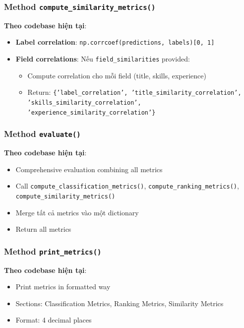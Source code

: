 \subsubsection{Method \texttt{compute\_similarity\_metrics()}}

\textbf{Theo codebase hiện tại}:

\begin{itemize}
    \item \textbf{Label correlation}: \texttt{np.corrcoef(predictions, labels)[0, 1]}
    \item \textbf{Field correlations}: Nếu \texttt{field\_similarities} provided:
    \begin{itemize}
        \item Compute correlation cho mỗi field (title, skills, experience)
        \item Return: \texttt{\{'label\_correlation', 'title\_similarity\_correlation', 'skills\_similarity\_correlation', 'experience\_similarity\_correlation'\}}
    \end{itemize}
\end{itemize}

\subsubsection{Method \texttt{evaluate()}}

\textbf{Theo codebase hiện tại}:

\begin{itemize}
    \item Comprehensive evaluation combining all metrics
    \item Call \texttt{compute\_classification\_metrics()}, \texttt{compute\_ranking\_metrics()}, \texttt{compute\_similarity\_metrics()}
    \item Merge tất cả metrics vào một dictionary
    \item Return all metrics
\end{itemize}

\subsubsection{Method \texttt{print\_metrics()}}

\textbf{Theo codebase hiện tại}:

\begin{itemize}
    \item Print metrics in formatted way
    \item Sections: Classification Metrics, Ranking Metrics, Similarity Metrics
    \item Format: 4 decimal places
\end{itemize}

